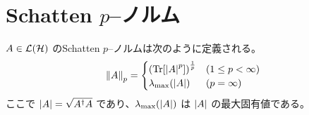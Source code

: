 \begin{comment}


\end{comment}


\section{Schatten $p$--ノルム}\label{sec:schatten-norm}
\begin{screen}
    \begin{definition}
        $A \in \mathcal{L}(\mathcal{H})$ のSchatten $p$--ノルムは次のように定義される。
        \begin{equation}
            \norm{A}_p = 
            \begin{cases}
                \qty(\Tr[\abs{A}^p])^{\frac1p} & (1 \leq p < \infty) \\
                \lambda_{\max}(\abs{A}) & (p = \infty)
            \end{cases}
        \end{equation}
        ここで $\abs{A} = \sqrt{A^\dagger A}$ であり、$\lambda_{\max}(\abs{A})$ は $\abs{A}$ の最大固有値である。
    \end{definition}
\end{screen}


